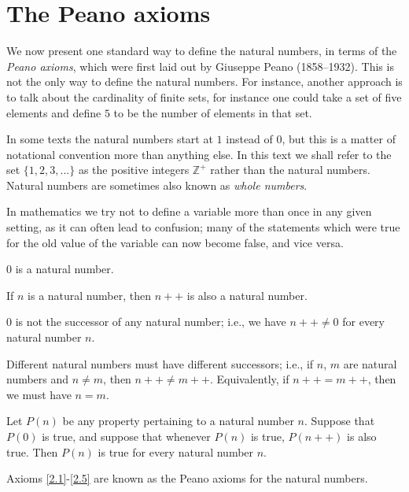 \section{The Peano axioms}

\begin{note}
We now present one standard way to define the natural numbers, in terms of the \emph{Peano axioms}, which were first laid out by Giuseppe Peano (1858–1932).
This is not the only way to define the natural numbers.
For instance, another approach is to talk about the cardinality of finite sets, for instance one could take a set of five elements and define \(5\) to be the number of elements in that set.
\end{note}

\begin{note}
In some texts the natural numbers start at \(1\) instead of \(0\), but this is a matter of notational convention more than anything else.
In this text we shall refer to the set \(\{1, 2, 3,...\}\) as the positive integers \(\mathds{Z}^+\) rather than the natural numbers.
Natural numbers are sometimes also known as \emph{whole numbers}.
\end{note}

\begin{note}
In mathematics we try not to define a variable more than once in any given setting, as it can often lead to confusion;
many of the statements which were true for the old value of the variable can now become false, and vice versa.
\end{note}

\begin{axiom}\label{2.1}
\(0\) is a natural number.
\end{axiom}

\begin{axiom}\label{2.2}
If \(n\) is a natural number, then \(n++\) is also a natural number.
\end{axiom}

\begin{axiom}\label{2.3}
\(0\) is not the successor of any natural number;
i.e., we have \(n++ \neq 0\) for every natural number \(n\).
\end{axiom}

\begin{axiom}\label{2.4}
Different natural numbers must have different successors;
i.e., if \(n\), \(m\) are natural numbers and \(n \neq m\), then \(n++ \neq m++\).
Equivalently, if \(n++ = m++\), then we must have \(n = m\).
\end{axiom}

\begin{axiom}\label{2.5}
Let \(P(n)\) be any property pertaining to a natural number \(n\).
Suppose that \(P(0)\) is true, and suppose that whenever \(P(n)\) is true, \(P(n++)\) is also true.
Then \(P(n)\) is true for every natural number \(n\).
\end{axiom}

\begin{note}
Axioms \ref{2.1}-\ref{2.5} are known as the Peano axioms for the natural numbers.
\end{note}